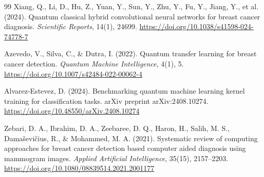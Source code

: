 \begin{thebibliography}{99}
    Xiang, Q., Li, D., Hu, Z., Yuan, Y., Sun, Y., Zhu, Y., Fu, Y., Jiang, Y., et al. (2024).
    Quantum classical hybrid convolutional neural networks for breast cancer diagnosis.
    \textit{Scientific Reports}, 14(1), 24699.
    \url{https://doi.org/10.1038/s41598-024-74778-7}

    Azevedo, V., Silva, C., \& Dutra, I. (2022). Quantum transfer learning for breast
    cancer detection. \textit{Quantum Machine Intelligence}, 4(1), 5.
    \url{https://doi.org/10.1007/s42484-022-00062-4}


    Alvarez-Estevez, D. (2024). Benchmarking quantum machine learning kernel training
    for classification tasks. arXiv preprint arXiv:2408.10274.
    \url{https://doi.org/10.48550/arXiv.2408.10274}

    Zebari, D. A., Ibrahim, D. A., Zeebaree, D. Q., Haron, H., Salih, M. S., Dama\v{s}evi\v{c}ius, R., \& Mohammed, M. A. (2021).
    Systematic review of computing approaches for breast cancer detection based computer aided diagnosis using mammogram images.
    \textit{Applied Artificial Intelligence}, 35(15), 2157--2203.
    \url{https://doi.org/10.1080/08839514.2021.2001177}



\end{thebibliography}
